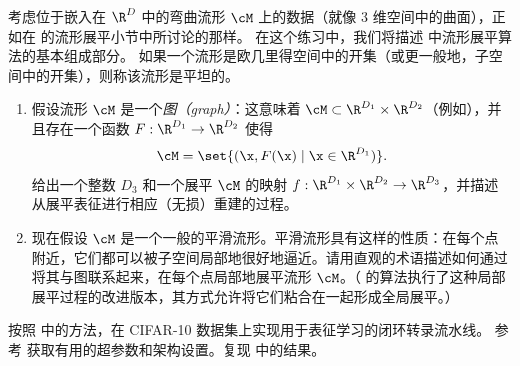 \documentclass[../../book-main_zh.tex]{subfiles}
\begin{document}
\begin{exercise}[流形展平的概念理解]
考虑位于嵌入在 $\R^D$ 中的弯曲流形 $\cM$ 上的数据（就像 $3$ 维空间中的曲面），正如在  的流形展平小节中所讨论的那样。
在这个练习中，我们将描述 \cite{Psenka-JMLR24} 中流形展平算法的基本组成部分。
如果一个流形是欧几里得空间中的开集（或更一般地，子空间中的开集），则称该流形是平坦的。

\begin{enumerate}
\item 假设流形 $\cM$ 是一个\textit{图（graph）}：这意味着 $\cM
    \subset \R^{D_1} \times \R^{D_2}$（例如），并且存在一个函数 $F
    : \R^{D_1} \to \R^{D_2}$ 使得
    \begin{equation}
        \cM = \set{(\x, F(\x) \mid \x \in \R^{D_1})}.
    \end{equation}
    给出一个整数 $D_3$ 和一个展平 $\cM$ 的映射 $f : \R^{D_1} \times \R^{D_2} \to \R^{D_3}$，并描述从展平表征进行相应（无损）重建的过程。
\item 现在假设 $\cM$ 是一个一般的平滑流形。平滑流形具有这样的性质：在每个点附近，它们都可以被子空间局部地很好地逼近。请用直观的术语描述如何通过将其与图联系起来，在每个点局部地展平流形 $\cM$。（\cite{Psenka-JMLR24} 的算法执行了这种局部展平过程的改进版本，其方式允许将它们粘合在一起形成全局展平。）
\end{enumerate}
\end{exercise}

\begin{exercise}[复现闭环转录]

按照  中的方法，在 CIFAR-10 数据集上实现用于表征学习的闭环转录流水线。
参考 \cite{Dai-entropy-2022} 获取有用的超参数和架构设置。复现  中的结果。

\end{exercise}
\end{document}
